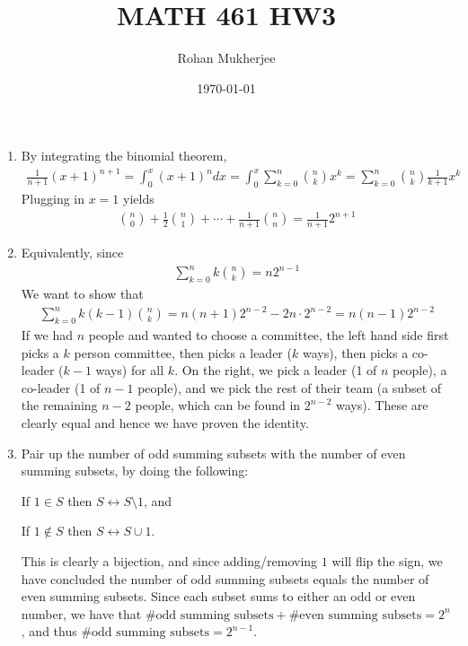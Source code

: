 \documentclass[12pt]{article}
\title{MATH 461 HW3}
\date{\today}
\author{Rohan Mukherjee}
\theoremstyle{definitionstyle}
\begin{document}
	\maketitle
	\begin{enumerate}
		\item By integrating the binomial theorem,
		\begin{align*}
			\frac{1}{n+1} (x+1)^{n+1}=\int_0^x (x+1)^ndx = \int_0^x \sum_{k=0}^n {n \choose k} x^k = \sum_{k=0}^n {n \choose k} \frac{1}{k+1} x^k
		\end{align*}
		Plugging in $x=1$ yields
		\begin{align*}
			{n \choose 0} + \frac12 {n \choose 1} + \cdots + \frac{1}{n+1} {n \choose n} = \frac{1}{n+1}2^{n+1}
		\end{align*}
	
		\newpage
		\item Equivalently, since 
		\begin{align*}
			\sum_{k=0}^{n} k{n \choose k} = n2^{n-1}
		\end{align*}
		We want to show that
		\begin{align*}
			\sum_{k=0}^{n} k(k-1) {n \choose k} = n(n+1)2^{n-2} - 2n \cdot 2^{n-2} = n(n-1)2^{n-2}
		\end{align*}
		If we had $n$ people and wanted to choose a committee, the left hand side first picks a $k$ person committee, then picks a leader ($k$ ways), then picks a co-leader ($k-1$ ways) for all $k$. On the right, we pick a leader (1 of $n$ people), a co-leader (1 of $n-1$ people), and we pick the rest of their team (a subset of the remaining $n-2$ people, which can be found in $2^{n-2}$ ways). These are clearly equal and hence we have proven the identity.
		
		\newpage
		\item Pair up the number of odd summing subsets with the number of even summing subsets, by doing the following:
		
		If $1 \in S$ then $S \leftrightarrow S \setminus 1$, and 
		
		If $1 \not \in S$ then $S \leftrightarrow S \cup 1$.
		
		This is clearly a bijection, and since adding/removing $1$ will flip the sign, we have concluded the number of odd summing subsets equals the number of even summing subsets. Since each subset sums to either an odd or even number, we have that $\text{\# odd summing subsets} + \text{\# even summing subsets} = 2^n$, and thus $\text{\# odd summing subsets} = 2^{n-1}$.
		

\end{enumerate}
\end{document}
